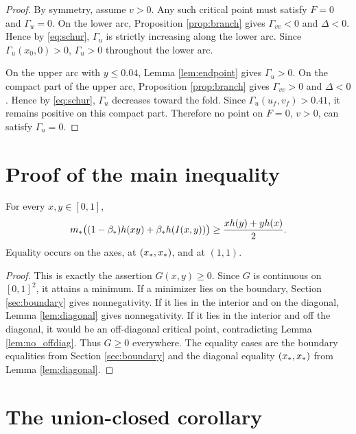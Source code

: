 \begin{proof}
By symmetry, assume \(v>0\).  Any such critical point must satisfy \(F=0\) and \(\Gamma_u=0\).  On the lower arc, Proposition \ref{prop:branch} gives \(\Gamma_{vv}<0\) and \(\Delta<0\).  Hence by \eqref{eq:schur}, \(\Gamma_u\) is strictly increasing along the lower arc.  Since \(\Gamma_u(x_0,0)>0\), \(\Gamma_u>0\) throughout the lower arc.

On the upper arc with \(y\le0.04\), Lemma \ref{lem:endpoint} gives \(\Gamma_u>0\).  On the compact part of the upper arc, Proposition \ref{prop:branch} gives \(\Gamma_{vv}>0\) and \(\Delta<0\).  Hence by \eqref{eq:schur}, \(\Gamma_u\) decreases toward the fold.  Since \(\Gamma_u(u_f,v_f)>0.41\), it remains positive on this compact part.  Therefore no point on \(F=0\), \(v>0\), can satisfy \(\Gamma_u=0\).
\end{proof}

\section{Proof of the main inequality}\label{sec:mainineq}

\begin{theorem}\label{thm:bivariate}
For every \(x,y\in[0,1]\),
\begin{equation}\label{eq:bivar_theorem}
  m_*\bigl((1-\beta_*)h(xy)+\beta_* h(I(x,y))\bigr)\ge \frac{x h(y)+y h(x)}2.
\end{equation}
Equality occurs on the axes, at \((x_*,x_*)\), and at \((1,1)\).
\end{theorem}

\begin{proof}
This is exactly the assertion \(G(x,y)\ge0\).  Since \(G\) is continuous on \([0,1]^2\), it attains a minimum.  If a minimizer lies on the boundary, Section \ref{sec:boundary} gives nonnegativity.  If it lies in the interior and on the diagonal, Lemma \ref{lem:diagonal} gives nonnegativity.  If it lies in the interior and off the diagonal, it would be an off-diagonal critical point, contradicting Lemma \ref{lem:no_offdiag}.  Thus \(G\ge0\) everywhere.  The equality cases are the boundary equalities from Section \ref{sec:boundary} and the diagonal equality \((x_*,x_*)\) from Lemma \ref{lem:diagonal}.
\end{proof}

\section{The union-closed corollary}\label{sec:corollary}


